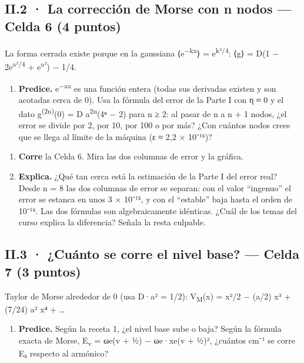 \subsection{II.2 · La corrección de Morse con n nodos --- Celda 6 (4 puntos)}

La forma cerrada existe porque en la gaussiana ⟨e\textsuperscript{−kx}⟩ = e\textsuperscript{k²/4}: ⟨g⟩ = D(1 − 2e\textsuperscript{a²/4} + e\textsuperscript{a²}) − 1/4.

\begin{enumerate}
\def\labelenumi{\alph{enumi})}
\tightlist
\item
  \textbf{Predice.} e\textsuperscript{−ax} es una función entera (todas sus derivadas existen y son acotadas cerca de 0). Usa la fórmula del error de la Parte I con η ≈ 0 y el dato g\textsuperscript{(2n)}(0) = D a\textsuperscript{2n}(4ⁿ − 2) para n ≥ 2: al pasar de n a n + 1 nodos, ¿el error se divide por 2, por 10, por 100 o por más? ¿Con cuántos nodos crees que se llega al límite de la máquina (ε ≈ 2,2 × 10⁻¹⁶)?
\end{enumerate}


\begin{enumerate}
\def\labelenumi{\alph{enumi})}
\setcounter{enumi}{1}
\item
  \textbf{Corre} la Celda 6. Mira las dos columnas de error y la gráfica.
\item
  \textbf{Explica.} ¿Qué tan cerca está la estimación de la Parte I del error real? Desde n = 8 las dos columnas de error se separan: con el valor ``ingenuo'' el error se estanca en unos 3 × 10⁻¹⁵, y con el ``estable'' baja hasta el orden de 10⁻¹⁶. Las dos fórmulas son algebraicamente idénticas. ¿Cuál de los temas del curso explica la diferencia? Señala la resta culpable.
\end{enumerate}



\subsection{II.3 · ¿Cuánto se corre el nivel base? --- Celda 7 (3 puntos)}

Taylor de Morse alrededor de 0 (usa D·a² = 1/2): V\textsubscript{M}(x) = x²/2 − (a/2) x³ + (7/24) a² x⁴ + \ldots{}

\begin{enumerate}
\def\labelenumi{\alph{enumi})}
\tightlist
\item
  \textbf{Predice.} Según la receta 1, ¿el nivel base sube o baja? Según la fórmula exacta de Morse, E\textsubscript{v} = ωe(v + ½) − ωe·xe(v + ½)², ¿cuántos cm⁻¹ se corre E₀ respecto al armónico?
\end{enumerate}


